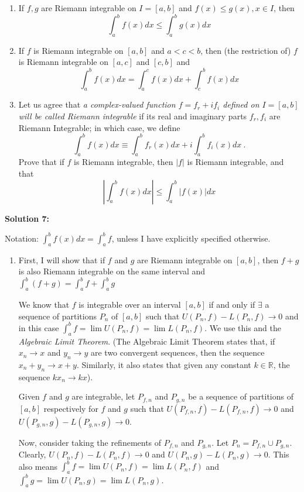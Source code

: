 \documentclass[11pt]{amsart}
\newcommand{\bbR}{\mathbb{R}}
\theoremstyle{definition}
\begin{document}
\begin{enumerate}[wide, labelwidth=!, labelindent=0pt]
\begin{enumerate}[label=(\alph*)]
\item If $f,g$ are Riemann integrable on $I = [a,b]$ and $f(x) \le g(x), x \in I$, then
\[
\int_a^b f(x) dx  \le \int_a^b g(x) dx
\]

\item If $f$ is Riemann integrable on $[a,b]$ and $a < c <b$, then (the restriction of)   $f$ is Riemann integrable on $[a,c]$ and $[c,b]$ and
\[
\int_a^b f(x) dx= \int_a^c f(x) dx+\int_c^b f(x) dx
\]

\item Let us agree that  \emph{a complex-valued function $f=f_r+if_i$ defined on $I=[a,b]$ will be called Riemann integrable} if its real and imaginary parts $f_r,f_i$ are Riemann Integrable; in which case, we define
\[
\int_a^b f(x) dx  \equiv  \int_a^b f_r(x) dx + i \int_a^b f_i(x) dx \ .
\]
Prove that if $f$ is Riemann integrable, then $|f|$ is Riemann integrable, and that
\[
|\int_a^b f(x) dx| \le \int_a^b |f(x)| dx
\]

\end{enumerate} 

\textbf{Solution 7:}

Notation: $\int_a^b f(x) dx = \int_a^b f$, unless I have explicitly specified otherwise.

\begin{enumerate}[label=(\alph*)]

\item

First, I will show that if $f$ and $g$ are Riemann integrable on $[a,b]$, then $f+g$ is also Riemann integrable on the same interval and $\int_a^b (f+g) = \int_a^b f + \int_a^b g$

We know that $f$ is integrable over an interval $[a,b]$ if and only if $\exists$ a sequence of partitions $P_n$ of $[a,b]$ such that $U(P_n,f)-L(P_n,f) \to 0$ and in this case $\int_a^b f = \lim U(P_n,f) = \lim L(P_n,f)$. We use this and the \textit{Algebraic Limit Theorem}. (The Algebraic Limit Theorem states that, if $x_n \to x$ and $y_n \to y$ are two convergent sequences, then the sequence $x_n + y_n \to x+y$. Similarly, it also states that given any constant $k \in \bbR$, the sequence $k x_n \to k x$).

Given $f$ and $g$ are integrable, let $P_{f,n}$ and $P_{g,n}$ be a sequence of partitions of $[a,b]$ respectively for $f$ and $g$ such that $U(P_{f,n},f)-L(P_{f,n},f) \to 0$ and $U(P_{g,n},g)-L(P_{g,n},g) \to 0$.

Now, consider taking the refinements of $P_{f,n}$ and $P_{g,n}$. Let $P_n = P_{f,n} \cup P_{g,n}$. Clearly, $U(P_{n},f)-L(P_{n},f) \to 0$ and $U(P_{n},g)-L(P_{n},g) \to 0$. This also means $\int_a^b f = \lim U(P_n,f) = \lim L(P_n,f)$ and $\int_a^b g = \lim U(P_n,g) = \lim L(P_n,g)$.


\end{enumerate}
\end{enumerate}
\end{document}
